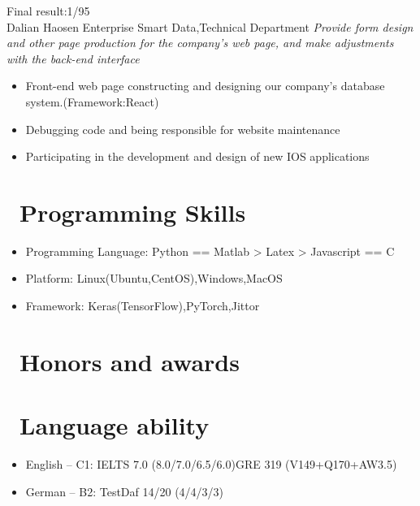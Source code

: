 \documentclass{resume}
\begin{document}
	Final result:1/95\\
	 {Dalian Haosen Enterprise Smart Data,Technical Department}
	\textit{Provide form design and other page production for the company's web page, and make adjustments with the back-end interface}
	\begin{itemize}
		\item Front-end web page constructing and designing our company's database system.(Framework:React)
		\item Debugging code and being responsible for website maintenance
		\item Participating in the development and design of new IOS applications
	\end{itemize}
	
	\section{\faCogs\ Programming Skills}
	\begin{itemize}[parsep=0.5ex]
		\item  Programming Language: Python == Matlab > Latex > Javascript == C
		\item Platform: Linux(Ubuntu,CentOS),Windows,MacOS
		\item Framework: Keras(TensorFlow),PyTorch,Jittor
	\end{itemize}
	
	\section{\faHeartO\ Honors and awards}
	
	\section{\faInfo\ Language ability}
	\begin{itemize}[parsep=0.5ex]
		\item English -- C1: IELTS 7.0 (8.0/7.0/6.5/6.0)\qquad GRE 319 (V149+Q170+AW3.5)
		\item German -- B2: TestDaf 14/20 (4/4/3/3)
	\end{itemize}
\end{document}
